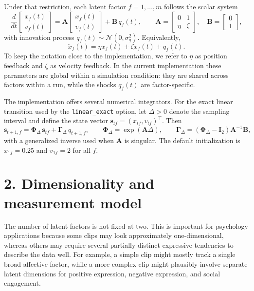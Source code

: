 \documentclass[10pt]{article}
\begin{document}
Under that restriction, each latent factor $f=1,\dots,m$ follows the scalar system
\begin{equation}
\frac{d}{dt}
\begin{bmatrix}
 x_f(t)\\ v_f(t)
\end{bmatrix}
=
\bm A
\begin{bmatrix}
 x_f(t)\\ v_f(t)
\end{bmatrix}
+ \bm B\, q_f(t),
\qquad
\bm A=
\begin{bmatrix}
0 & 1\\ \eta & \zeta
\end{bmatrix},
\quad
\bm B=
\begin{bmatrix}
0\\1
\end{bmatrix},
\end{equation}
with innovation process $q_f(t)\sim \mathcal N(0,\sigma_q^2)$. Equivalently,
\begin{equation}
\ddot x_f(t)=\eta x_f(t)+\zeta \dot x_f(t)+q_f(t).
\label{eq:secondorder}
\end{equation}
To keep the notation close to the implementation, we refer to $\eta$ as position feedback and $\zeta$ as velocity feedback. In the current implementation these parameters are global within a simulation condition: they are shared across factors within a run, while the shocks $q_f(t)$ are factor-specific.

The implementation offers several numerical integrators. For the exact linear transition used by the \texttt{linear\_exact} option, let $\Delta>0$ denote the sampling interval and define the state vector $\bm s_{tf}=(x_{tf},v_{tf})^\top$. Then
\begin{equation}
\bm s_{t+1,f}=\bm \Phi_{\Delta}\,\bm s_{tf}+\bm \Gamma_{\Delta}\, q_{t+1,f},
\qquad
\bm \Phi_{\Delta}=\exp(\bm A\Delta),
\qquad
\bm \Gamma_{\Delta}=(\bm \Phi_{\Delta}-\bm I_2)\bm A^{-1}\bm B,
\label{eq:exact}
\end{equation}
with a generalized inverse used when $\bm A$ is singular. The default initialization is $x_{1f}=0.25$ and $v_{1f}=2$ for all $f$.

\section*{2. Dimensionality and measurement model}
The number of latent factors is not fixed at two. This is important for psychology applications because some clips may look approximately one-dimensional, whereas others may require several partially distinct expressive tendencies to describe the data well. For example, a simple clip might mostly track a single broad affective factor, while a more complex clip might plausibly involve separate latent dimensions for positive expression, negative expression, and social engagement.
\end{document}
